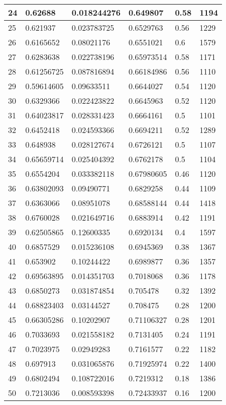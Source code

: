 \begin{longtable}{|l|l|l|l|l|l|}
24 & 0.62688 & 0.018244276 & 0.649807 & 0.58 & 1194 \\ \hline 
25 & 0.621937 & 0.023783725 & 0.6529763 & 0.56 & 1229 \\ \hline 
26 & 0.6165652 & 0.08021176 & 0.6551021 & 0.6 & 1579 \\ \hline 
27 & 0.6283638 & 0.022738196 & 0.65973514 & 0.58 & 1171 \\ \hline 
28 & 0.61256725 & 0.087816894 & 0.66184986 & 0.56 & 1110 \\ \hline 
29 & 0.59614605 & 0.09633511 & 0.6644027 & 0.54 & 1120 \\ \hline 
30 & 0.6329366 & 0.022423822 & 0.6645963 & 0.52 & 1120 \\ \hline 
31 & 0.64023817 & 0.028331423 & 0.6664161 & 0.5 & 1101 \\ \hline 
32 & 0.6452418 & 0.024593366 & 0.6694211 & 0.52 & 1289 \\ \hline 
33 & 0.648938 & 0.028127674 & 0.6726121 & 0.5 & 1107 \\ \hline 
34 & 0.65659714 & 0.025404392 & 0.6762178 & 0.5 & 1104 \\ \hline 
35 & 0.6554204 & 0.033382118 & 0.67980605 & 0.46 & 1120 \\ \hline 
36 & 0.63802093 & 0.09490771 & 0.6829258 & 0.44 & 1109 \\ \hline 
37 & 0.6363066 & 0.08951078 & 0.68588144 & 0.44 & 1418 \\ \hline 
38 & 0.6760028 & 0.021649716 & 0.6883914 & 0.42 & 1191 \\ \hline 
39 & 0.62505865 & 0.12600335 & 0.6920134 & 0.4 & 1597 \\ \hline 
40 & 0.6857529 & 0.015236108 & 0.6945369 & 0.38 & 1367 \\ \hline 
41 & 0.653902 & 0.10244422 & 0.6989877 & 0.36 & 1357 \\ \hline 
42 & 0.69563895 & 0.014351703 & 0.7018068 & 0.36 & 1178 \\ \hline 
43 & 0.6850273 & 0.031874854 & 0.705478 & 0.32 & 1392 \\ \hline 
44 & 0.68823403 & 0.03144527 & 0.708475 & 0.28 & 1200 \\ \hline 
45 & 0.66305286 & 0.10202907 & 0.71106327 & 0.28 & 1201 \\ \hline 
46 & 0.7033693 & 0.021558182 & 0.7131405 & 0.24 & 1191 \\ \hline 
47 & 0.7023975 & 0.02949283 & 0.7161577 & 0.22 & 1182 \\ \hline 
48 & 0.697913 & 0.031065876 & 0.71925974 & 0.22 & 1400 \\ \hline 
49 & 0.6802494 & 0.108722016 & 0.7219312 & 0.18 & 1386 \\ \hline 
50 & 0.7213036 & 0.008593398 & 0.72433937 & 0.16 & 1200 \\ \hline 
\end{longtable}